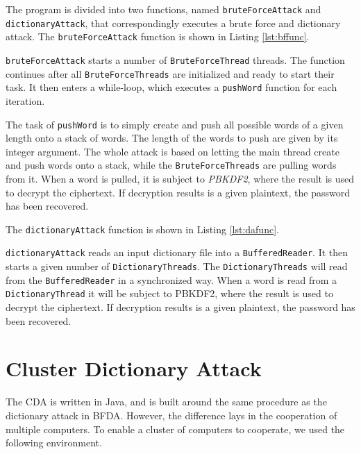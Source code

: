 \documentclass[pdftex,english,10pt,b5paper,twoside]{book}
\begin{document}
The program is divided into two functions, named \texttt{bruteForceAttack} and
\texttt{dictionaryAttack}, that correspondingly executes a brute force and
dictionary attack. The \texttt{bruteForceAttack} function is shown in Listing
\ref{lst:bffunc}.



\texttt{bruteForceAttack} starts a number of \texttt{BruteForceThread} threads.
The function continues after all \texttt{BruteForceThreads} are initialized and
ready to start their task. It then enters a while-loop, which executes a
\texttt{pushWord} function for each iteration.

The task of \texttt{pushWord} is to simply create and push all possible words
of a given length onto a stack of words. The length of the words to push are
given by its integer argument. The whole attack is based on letting the main
thread create and push words onto a stack, while the \texttt{BruteForceThreads}
are pulling words from it. When a word is pulled, it is subject to
\emph{PBKDF2}, where the result is used to decrypt the ciphertext. If
decryption results is a given plaintext, the password has been recovered.

The \texttt{dictionaryAttack} function is shown in Listing \ref{lst:dafunc}.



\texttt{dictionaryAttack} reads an input dictionary file into a
\texttt{BufferedReader}. It then starts a given number of
\texttt{DictionaryThreads}. The \texttt{DictionaryThreads} will read from the
\texttt{BufferedReader} in a synchronized way. When a word is read from a
\texttt{DictionaryThread} it will be subject to \ac{PBKDF2}, where the result is
used to decrypt the ciphertext. If decryption results is a given plaintext, the
password has been recovered.

\section{Cluster Dictionary Attack}

The \ac{CDA} is written in Java, and is built around the same procedure as the
dictionary attack in \ac{BFDA}. However, the difference lays in the cooperation
of multiple computers. To enable a cluster of computers to cooperate, we used
the following environment.
\end{document}
